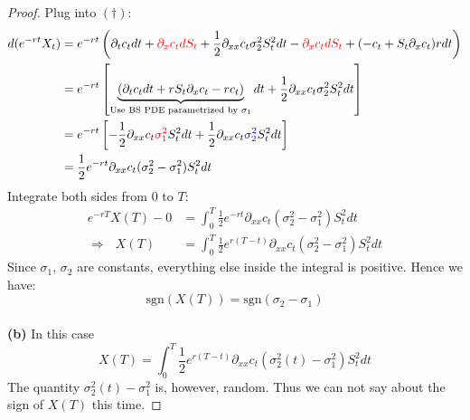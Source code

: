 \documentclass[a4paper, 10pt]{article}
\theoremstyle{definition}
\theoremstyle{hSol}
\begin{document}
\begin{proof}
Plug into $(\dag)$:
\begin{equation}
	\begin{split}
		d(e^{-rt}X_t) &= e^{-rt}\left(\partial_t c_t dt + \textcolor{red}{\partial_x c_t dS_t} + \frac{1}{2}\partial_{xx}c_t \sigma_2^2 S_t^2 dt - \textcolor{red}{\partial_x c_t dS_t} + (- c_t + S_t \partial_xc_t)rdt\right) \\
		&= e^{-rt}\left[\underbrace{\left(\partial_t c_t dt + rS_t \partial_xc_t -rc_t\right)}_{\text{Use BS PDE parametrized by~}\sigma_1}dt + \frac{1}{2}\partial_{xx}c_t \sigma_2^2 S_t^2 dt\right]\\
		&= e^{-rt}\left[-\frac{1}{2}\partial_{xx}c_t \textcolor{red}{\sigma_1^2} S_t^2 dt+ \frac{1}{2}\partial_{xx}c_t \textcolor{blue}{\sigma_2^2} S_t^2 dt\right]\\
		&= \frac{1}{2}e^{-rt}\partial_{xx}c_t (\sigma_2^2-\sigma_1^2) S_t^2 dt
	\end{split}
\end{equation}
Integrate both sides from $0$ to $T$:
\begin{equation}
	\begin{split}
		e^{-rT}X(T) - 0&= \int_0^T\frac{1}{2} e^{-rt}\partial_{xx}c_t (\sigma_2^2-\sigma_1^2) S_t^2 dt \\
		\Rightarrow~~~X(T) &=\int_0^T \frac{1}{2} e^{r(T-t)}\partial_{xx}c_t (\sigma_2^2-\sigma_1^2) S_t^2 dt
	\end{split}
\end{equation}
Since $\sigma_1$, $\sigma_2$ are constants, everything else inside the integral is positive. Hence we have:
$$
\text{sgn}(X(T)) = \text{sgn}(\sigma_2 - \sigma_1)
$$
~\\
\textbf{(b)} In this case
\begin{equation}
	X(T) =\int_0^T \frac{1}{2} e^{r(T-t)}\partial_{xx}c_t (\sigma_2^2(t)-\sigma_1^2) S_t^2 dt
\end{equation}
The quantity $\sigma_2^2(t)-\sigma_1^2$ is, however, random. Thus we can not say about the sign of $X(T)$ this time.
\end{proof}
\end{document}
